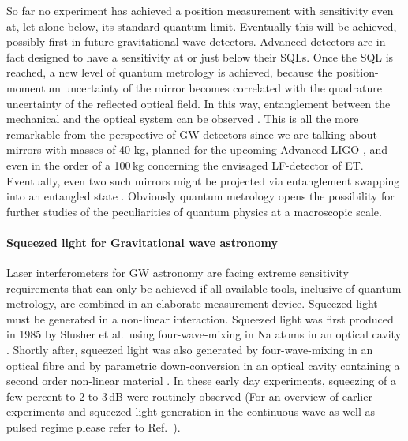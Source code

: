 So far no experiment has achieved a position measurement with
sensitivity even at, let alone below, its standard quantum limit.
Eventually this will be achieved, possibly first in future
gravitational wave detectors.  Advanced detectors are in
fact designed to have a sensitivity at or just below their SQLs.
Once the SQL is reached, a new level of quantum metrology is achieved, because the position-momentum
uncertainty of the mirror becomes correlated with the quadrature
uncertainty of the reflected optical field. In this way, entanglement
between the mechanical and the optical system can be observed
\cite{Vitali2007}. This is all the more remarkable from the perspective of GW detectors
since we are talking about mirrors with masses of 40 kg, planned for
the upcoming Advanced LIGO \cite{aLIGO}, and even in the order of a 100\,kg concerning the envisaged LF-detector of ET.
Eventually, even two such mirrors might be projected via entanglement swapping
\cite{Pirandola2006} into an entangled state \cite{M-Ebhardt2008}.
Obviously quantum metrology opens the possibility for further
studies of the peculiarities of quantum physics at a macroscopic scale.



\FloatBarrier
\paragraph{Squeezed light for Gravitational wave astronomy}\label{subsec:SQZforGWD}
Laser interferometers for GW astronomy are facing extreme sensitivity requirements that can only be achieved if all available
tools, inclusive of quantum metrology, are combined in an elaborate measurement device.  Squeezed light must be generated in a non-linear
interaction. Squeezed light was first produced in 1985 by
Slusher et al.\ using four-wave-mixing in Na atoms in an optical
cavity \cite{Slusher1985}. Shortly after, squeezed light was also
generated by four-wave-mixing in an optical fibre \cite{Shelby1986}
and by parametric down-conversion in an optical cavity containing a
second order non-linear material \cite{Wu1986}. In these early day
experiments, squeezing of a few percent to 2  to 3\,dB were routinely observed (For an
overview of earlier experiments and squeezed light generation in
the continuous-wave as well as pulsed regime please refer to Ref.~\cite{BachorRalph2004}).


